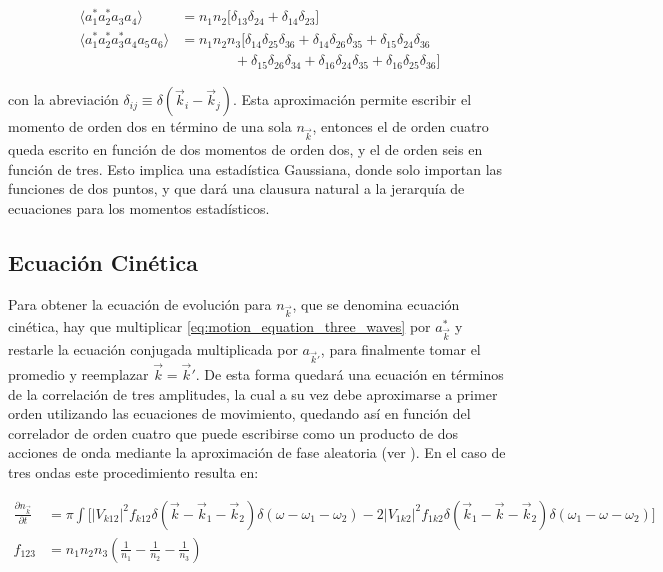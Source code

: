 \begin{equation}
	\begin{split}
		\langle	a_1^*a_2^*a_3a_4 \rangle & = n_1 n_2 \big[\delta_{13}\delta_{24} + \delta_{14}\delta_{23}\big] \\ 
		\langle a_1^*a_2^*a_3^*a_4a_5a_6 \rangle &= n_1n_2n_3\big[  \delta_{14}\delta_{25}\delta_{36} + \delta_{14}\delta_{26}\delta_{35} + \delta_{15}\delta_{24}\delta_{36} \\ 
		&\qquad\quad\;\;\; +\delta_{15}\delta_{26}\delta_{34} + \delta_{16}\delta_{24}\delta_{35} + \delta_{16}\delta_{25}\delta_{36} \big] 
	\end{split}
\end{equation}

\noindent con la abreviación $\delta_{ij}\equiv\delta(\vec k_i-\vec k_j)$. Esta aproximación permite escribir el momento de orden dos en término de una sola $n_{\vec k}$, entonces el de orden cuatro queda escrito en función de dos momentos de orden dos, y el de orden seis en función de tres. Esto implica una estadística Gaussiana, donde solo importan las funciones de dos puntos, y que dará una clausura natural a la jerarquía de ecuaciones para los momentos estadísticos.   %





\subsection{Ecuación Cinética} 
Para obtener la ecuación de evolución para $n_{\vec k}$, que se denomina ecuación cinética, hay que multiplicar \eqref{eq:motion_equation_three_waves} por $a^*_{\vec k}$ y restarle la ecuación conjugada multiplicada por $a_{\vec k'}$, para finalmente tomar el promedio y reemplazar $\vec k=\vec k'$. De esta forma quedará una ecuación en términos de la correlación de tres amplitudes, la cual a su vez debe aproximarse a primer orden utilizando las ecuaciones de movimiento, quedando así en función del correlador de orden cuatro que puede escribirse como un producto de dos acciones de onda mediante la aproximación de fase aleatoria (ver \cite{zakharovKolmogorovSpectraTurbulence1992}). En el caso de tres ondas este procedimiento resulta en: %

\begin{equation}
	\begin{split}
		\frac{\partial n_{\vec k}}{\partial t} &= \pi \int\bigg[|V_{k12}|^2f_{k12}\delta(\vec k - \vec k_1 - \vec k_2) \delta(\omega - \omega_1 - \omega_2) - 2 |V_{1k2}|^2 f_{1k2} \delta(\vec k_1 - \vec k - \vec k_2) \delta(\omega_1 - \omega - \omega_2) \bigg]  \\ 
		f_{123} &= n_1n_2n_3\left(\frac{1}{n_1} - \frac{1}{n_2} -  \frac{1}{n_3}\right)
	\end{split}
\end{equation}

